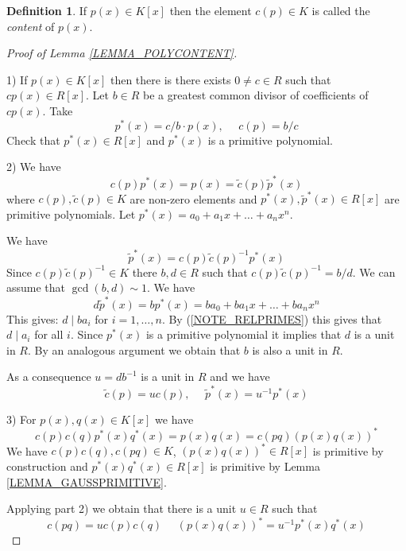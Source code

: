 \documentclass[12pt, letterpaper, oneside]{article}
\theoremstyle{plain}
\theoremstyle{definition}
\newtheorem{definition}[theorem]{Definition}
\newcommand{\vs}{\vskip 5mm}
\begin{document}
 \vs\vs
 
 \begin{definition}
 If $p(x)\in K[x]$ then the element $c(p)\in K$ is called the \emph{content} of $p(x)$.
 \end{definition}
 
 
 \vs\vs
 
 \begin{proof}[Proof of Lemma \ref{LEMMA_POLYCONTENT}]\ 
 
 1) If $p(x)\in K[x]$ then there is there exists $0\neq c\in R$ such that $cp(x)\in R[x]$. 
 Let $b\in R$ be a greatest common divisor of coefficients of $cp(x)$. Take 
 $$p^{\ast}(x) = c/b \cdot p(x), \ \ \ \ \ \ c(p) = b/c$$
 Check that $p^{\ast}(x)\in R[x]$ and  $p^{\ast}(x)$ is a primitive polynomial. 
 
 \vs
 
 2) We have 
 $$c(p)p^{\ast}(x) = p(x) = \tilde c(p)\tilde p^{\ast}(x)$$
 where $c(p), \tilde c(p) \in K$ are non-zero elements 
 and $p^{\ast}(x), \tilde p^{\ast}(x)\in R[x]$ are primitive polynomials. Let 
 $p^{\ast}(x) = a_{0} + a_{1}x + {\dots} + a_{n}x^{n}$.
 
 We have 
 $$\tilde p^{\ast}(x) = c(p)\tilde c(p)^{-1} p^{\ast}(x)$$
Since  $ c(p)\tilde c(p)^{-1} \in K$ there  $b, d\in R$ such that $ c(p)\tilde c(p)^{-1} = b/d$. 
 We can assume that $\gcd(b,d)\sim 1$. We have 
 $$d\tilde p^{\ast}(x) = bp^{\ast}(x) = ba_{0} + ba_{1}x + {\dots} + ba_{n}x^{n}$$
 This gives: $d \mid ba_{i}$ for $i=1, \dots, n$. By (\ref{NOTE_RELPRIMES}) this gives
 that $d\mid a_{i}$ for all $i$. Since $p^{\ast}(x)$ is a primitive polynomial it implies that 
 $d$ is a unit in $R$. By an analogous argument we obtain that $b$ is also a unit in $R$. 
 
 As a consequence $u = db^{-1}$ is a unit in $R$ and we have
$$\tilde c(p) = uc(p), \ \ \ \ \ \ \tilde p^{\ast}(x) = u^{-1}p^{\ast}(x)$$


\vs 

3) For $p(x), q(x)\in K[x]$ we have 
$$c(p)c(q)p^{\ast}(x)q^{\ast}(x) = p(x)q(x) = c(pq)(p(x)q(x))^{\ast}$$
We have $c(p)c(q), c(pq)\in K$, $(p(x)q(x))^{\ast}\in R[x]$ is primitive by construction
and $p^{\ast}(x)q^{\ast}(x)\in R[x]$ is primitive by Lemma \ref{LEMMA_GAUSSPRIMITIVE}.  

Applying part 2)  we obtain that there is a unit $u\in R$ such that  
 $$c(pq) = u c(p)c(q)\ \ \ \ \ \  (p(x)q(x))^{\ast} = u^{-1}p^{\ast}(x)q^{\ast}(x)$$ 
 \end{proof}
 
\end{document}

